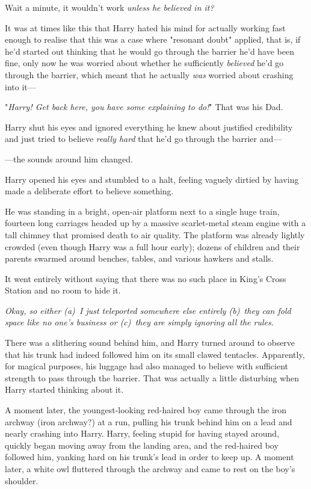 Wait a minute, it wouldn't work \emph{unless he believed in it?}

It was at times like this that Harry hated his mind for actually working fast
enough to realise that this was a case where "resonant doubt" applied, that is,
if he'd started out thinking that he would go through the barrier he'd have
been fine, only now he was worried about whether he sufficiently
\emph{believed} he'd go through the barrier, which meant that he actually
\emph{was} worried about crashing into it---

"\emph{Harry! Get back here, you have some explaining to do!}" That was his Dad.

Harry shut his eyes and ignored everything he knew about justified credibility
and just tried to believe \emph{really hard} that he'd go through the barrier
and---

---the sounds around him changed.

Harry opened his eyes and stumbled to a halt, feeling vaguely dirtied by having
made a deliberate effort to believe something.

He was standing in a bright, open-air platform next to a single huge train,
fourteen long carriages headed up by a massive scarlet-metal steam engine with
a tall chimney that promised death to air quality. The platform was already
lightly crowded (even though Harry was a full hour early); dozens of children
and their parents swarmed around benches, tables, and various hawkers and
stalls.

It went entirely without saying that there was no such place in King's Cross
Station and no room to hide it.

\emph{Okay, so either (a)~I just teleported somewhere else entirely (b)~they
can fold space like no one's business or (c)~they are simply ignoring all the
rules.}

There was a slithering sound behind him, and Harry turned around to observe
that his trunk had indeed followed him on its small clawed tentacles.
Apparently, for magical purposes, his luggage had also managed to believe with
sufficient strength to pass through the barrier. That was actually a little
disturbing when Harry started thinking about it.

A moment later, the youngest-looking red-haired boy came through the iron
archway (iron archway?) at a run, pulling his trunk behind him on a lead and
nearly crashing into Harry. Harry, feeling stupid for having stayed around,
quickly began moving away from the landing area, and the red-haired boy
followed him, yanking hard on his trunk's lead in order to keep up. A moment
later, a white owl fluttered through the archway and came to rest on the boy's
shoulder.

